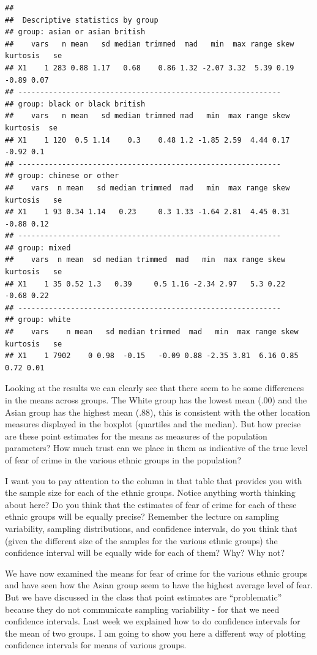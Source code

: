\documentclass[
]{book}
\begin{document}
\begin{verbatim}
## 
##  Descriptive statistics by group 
## group: asian or asian british
##    vars   n mean   sd median trimmed  mad   min  max range skew kurtosis   se
## X1    1 283 0.88 1.17   0.68    0.86 1.32 -2.07 3.32  5.39 0.19    -0.89 0.07
## ------------------------------------------------------------ 
## group: black or black british
##    vars   n mean   sd median trimmed mad   min  max range skew kurtosis  se
## X1    1 120  0.5 1.14    0.3    0.48 1.2 -1.85 2.59  4.44 0.17    -0.92 0.1
## ------------------------------------------------------------ 
## group: chinese or other
##    vars  n mean   sd median trimmed  mad   min  max range skew kurtosis   se
## X1    1 93 0.34 1.14   0.23     0.3 1.33 -1.64 2.81  4.45 0.31    -0.88 0.12
## ------------------------------------------------------------ 
## group: mixed
##    vars  n mean  sd median trimmed  mad   min  max range skew kurtosis   se
## X1    1 35 0.52 1.3   0.39     0.5 1.16 -2.34 2.97   5.3 0.22    -0.68 0.22
## ------------------------------------------------------------ 
## group: white
##    vars    n mean   sd median trimmed  mad   min  max range skew kurtosis   se
## X1    1 7902    0 0.98  -0.15   -0.09 0.88 -2.35 3.81  6.16 0.85     0.72 0.01
\end{verbatim}

Looking at the results we can clearly see that there seem to be some differences in the means across groups. The White group has the lowest mean (.00) and the Asian group has the highest mean (.88), this is consistent with the other location measures displayed in the boxplot (quartiles and the median). But how precise are these point estimates for the means as measures of the population parameters? How much trust can we place in them as indicative of the true level of fear of crime in the various ethnic groups in the population?

I want you to pay attention to the column in that table that provides you with the sample size for each of the ethnic groups. Notice anything worth thinking about here? Do you think that the estimates of fear of crime for each of these ethnic groups will be equally precise? Remember the lecture on sampling variability, sampling distributions, and confidence intervals, do you think that (given the different size of the samples for the various ethnic groups) the confidence interval will be equally wide for each of them? Why? Why not?

We have now examined the means for fear of crime for the various ethnic groups and have seen how the Asian group seem to have the highest average level of fear. But we have discussed in the class that point estimates are ``problematic'' because they do not communicate sampling variability - for that we need confidence intervals. Last week we explained how to do confidence intervals for the mean of two groups. I am going to show you here a different way of plotting confidence intervals for means of various groups.
\end{document}
